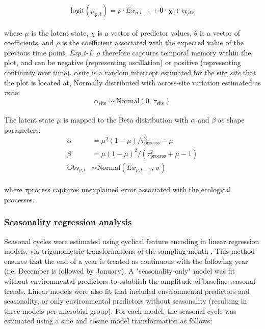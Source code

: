 \documentclass[11pt]{article}
\begin{document}
\begin{equation}
\text{logit}(\mu_{p,t}) = \rho \cdot Ex_{p,t-1} + \boldsymbol{\theta} \cdot \boldsymbol{\chi} + \alpha_\text{site}
\label{eq:process_model}
\end{equation}
 \\
where $\mu$ is the latent state, $\chi$ is a vector of predictor values, $\theta$ is a vector of coefficients, and $\rho$ is the coefficient associated with the expected value of the previous time point, \textit{Exp,t-1}. $\rho$ therefore captures temporal memory within the plot, and can be negative (representing oscillation) or positive (representing continuity over time). $\alpha$site is a random intercept estimated for the site \textit{site} that the plot is located at, Normally distributed with across-site variation estimated as $\tau$site:
\begin{equation}
\alpha_\text{site} \sim \text{Normal}(0,\, \tau_\text{site})
\label{eq:site_effect}
\end{equation}
 \\
The latent state $\mu$ is mapped to the Beta distribution with $\alpha$ and $\beta$ as shape parameters:
\begin{align}
\alpha &= \mu^2 (1 - \mu) / \tau^2_\text{process} - \mu \label{eq:beta_alpha} \\
\beta &= \mu (1 - \mu)^2 / (\tau^2_\text{process} + \mu - 1) \label{eq:beta_beta} \\
Obs_{p,t} &\sim \text{Normal}(Ex_{p,t-1},\, \sigma) \label{eq:process_error}
\end{align}
 \\
where $\tau$process  captures unexplained error associated with the ecological processes.

\subsubsection{Seasonality regression analysis}

Seasonal cycles were estimated using cyclical feature encoding in linear regression models, via trigonometric transformations of the sampling month \cite{stolwijk_studying_1999}. This method ensures that the end of a year is treated as continuous with the following year (i.e. December is followed by January). A "seasonality-only" model was fit without environmental predictors to establish the amplitude of baseline seasonal trends. Linear models were also fit that included environmental predictors and seasonality, or only environmental predictors without seasonality (resulting in three models per microbial group). For each model, the seasonal cycle was estimated using a sine and cosine model transformation as follows: \\
\end{document}
